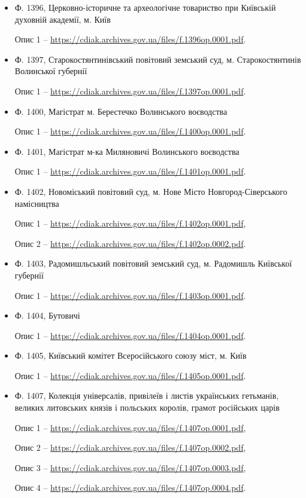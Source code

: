 \begin{itemize}
\item Ф. 1396, Церковно-історичне та археологічне товариство при Київській духовній академії, м. Київ\par
   Опис 1 – \url{https://cdiak.archives.gov.ua/files/f.1396op.0001.pdf}.

\item Ф. 1397, Старокостянтинівський повітовий земський суд, м. Старокостянтинів Волинської губернії\par
   Опис 1 – \url{https://cdiak.archives.gov.ua/files/f.1397op.0001.pdf}.

\item Ф. 1400, Магістрат м. Берестечко Волинського воєводства\par
   Опис 1 – \url{https://cdiak.archives.gov.ua/files/f.1400op.0001.pdf}.

\item Ф. 1401, Магістрат м-ка Миляновичі Волинського воєводства\par
   Опис 1 – \url{https://cdiak.archives.gov.ua/files/f.1401op.0001.pdf}.

\item Ф. 1402, Новоміський повітовий суд, м. Нове Місто Новгород-Сіверського намісництва\par
   Опис 1 – \url{https://cdiak.archives.gov.ua/files/f.1402op.0001.pdf},\par
   Опис 2 – \url{https://cdiak.archives.gov.ua/files/f.1402op.0002.pdf}.

\item Ф. 1403, Радомишльський повітовий земський суд, м. Радомишль Київської губернії\par
   Опис 1 – \url{https://cdiak.archives.gov.ua/files/f.1403op.0001.pdf}.

\item Ф. 1404, Бутовичі\par
   Опис 1 – \url{https://cdiak.archives.gov.ua/files/f.1404op.0001.pdf}.

\item Ф. 1405, Київський комітет Всеросійського союзу міст, м. Київ\par
Опис 1 – \url{https://cdiak.archives.gov.ua/files/f.1405op.0001.pdf}.

\item Ф. 1407, Колекція універсалів, привілеїв і листів українських гетьманів, великих литовських князів і польських королів, грамот російських царів\par
   Опис 1 – \url{https://cdiak.archives.gov.ua/files/f.1407op.0001.pdf},\par
   Опис 2 – \url{https://cdiak.archives.gov.ua/files/f.1407op.0002.pdf},\par
   Опис 3 – \url{https://cdiak.archives.gov.ua/files/f.1407op.0003.pdf},\par
   Опис 4 – \url{https://cdiak.archives.gov.ua/files/f.1407op.0004.pdf}.\par


\end{itemize}
